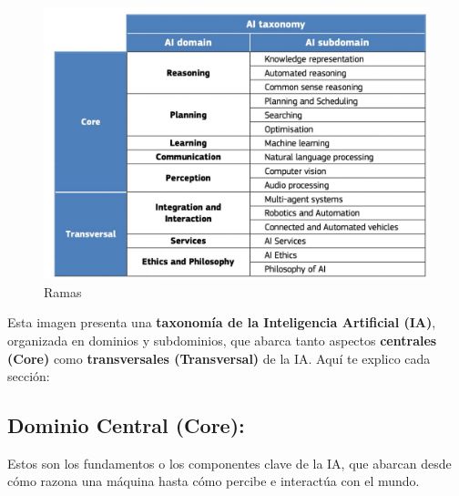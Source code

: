 \documentclass[
  10pt,
  letterpaper,
]{book}
\begin{document}
\begin{figure}[H]

{\centering \includegraphics{Img/taxonomia.jpg}

}

\caption{Ramas}

\end{figure}%

Esta imagen presenta una \textbf{taxonomía de la Inteligencia Artificial
(IA)}, organizada en dominios y subdominios, que abarca tanto aspectos
\textbf{centrales (Core)} como \textbf{transversales (Transversal)} de
la IA. Aquí te explico cada sección:

\subsection{Dominio Central (Core):}\label{dominio-central-core}

Estos son los fundamentos o los componentes clave de la IA, que abarcan
desde cómo razona una máquina hasta cómo percibe e interactúa con el
mundo.
\end{document}
